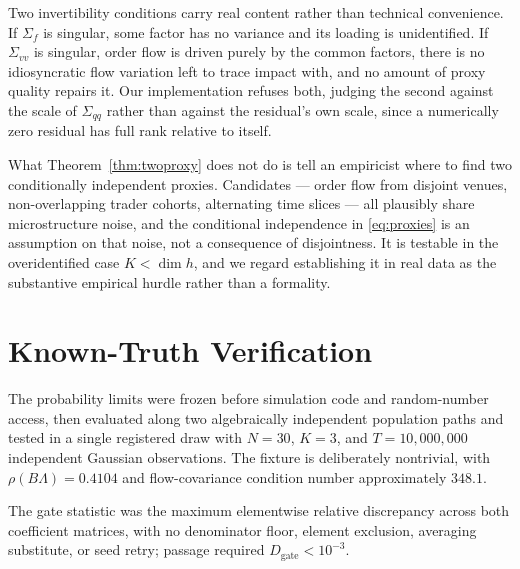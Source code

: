 \documentclass[10pt,twocolumn]{article}
\theoremstyle{remark}
\begin{document}
Two invertibility conditions carry real content rather than technical
convenience. If $\Sigma_f$ is singular, some factor has no variance and its
loading is unidentified. If $\Sigma_{vv}$ is singular, order flow is driven
purely by the common factors, there is no idiosyncratic flow variation left to
trace impact with, and no amount of proxy quality repairs it. Our
implementation refuses both, judging the second against the scale of
$\Sigma_{qq}$ rather than against the residual's own scale, since a numerically
zero residual has full rank relative to itself.

What Theorem~\ref{thm:twoproxy} does not do is tell an empiricist where to find
two conditionally independent proxies. Candidates --- order flow from disjoint
venues, non-overlapping trader cohorts, alternating time slices --- all
plausibly share microstructure noise, and the conditional independence in
\eqref{eq:proxies} is an assumption on that noise, not a consequence of
disjointness. It is testable in the overidentified case $K<\dim h$, and we
regard establishing it in real data as the substantive empirical hurdle rather
than a formality.

\section{Known-Truth Verification}
\label{sec:verify}

The probability limits were frozen before simulation code and random-number
access, then evaluated along two algebraically independent population paths and
tested in a single registered draw with $N=30$, $K=3$, and
$T=10{,}000{,}000$ independent Gaussian observations. The fixture is
deliberately nontrivial, with $\rho(B\Lambda)=0.4104$ and flow-covariance
condition number approximately $348.1$.

The gate statistic was the maximum elementwise relative discrepancy across both
coefficient matrices, with no denominator floor, element exclusion, averaging
substitute, or seed retry; passage required $D_{\mathrm{gate}}<10^{-3}$.
\end{document}
